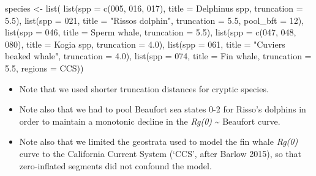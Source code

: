 \documentclass[
]{book}
\newenvironment{Shaded}{\begin{snugshade}}{\end{snugshade}}
\newcommand{\AttributeTok}[1]{\textcolor[rgb]{0.77,0.63,0.00}{#1}}
\newcommand{\FloatTok}[1]{\textcolor[rgb]{0.00,0.00,0.81}{#1}}
\newcommand{\FunctionTok}[1]{\textcolor[rgb]{0.00,0.00,0.00}{#1}}
\newcommand{\NormalTok}[1]{#1}
\newcommand{\OtherTok}[1]{\textcolor[rgb]{0.56,0.35,0.01}{#1}}
\newcommand{\StringTok}[1]{\textcolor[rgb]{0.31,0.60,0.02}{#1}}
\begin{document}
\begin{Shaded}
\begin{Highlighting}[]
\NormalTok{species }\OtherTok{\textless{}{-}} \FunctionTok{list}\NormalTok{(}
  \FunctionTok{list}\NormalTok{(}\AttributeTok{spp =} \FunctionTok{c}\NormalTok{(}\StringTok{\textquotesingle{}005\textquotesingle{}}\NormalTok{, }\StringTok{\textquotesingle{}016\textquotesingle{}}\NormalTok{, }\StringTok{\textquotesingle{}017\textquotesingle{}}\NormalTok{),}
       \AttributeTok{title =} \StringTok{\textquotesingle{}Delphinus spp\textquotesingle{}}\NormalTok{,}
       \AttributeTok{truncation =} \FloatTok{5.5}\NormalTok{),}
  \FunctionTok{list}\NormalTok{(}\AttributeTok{spp =} \StringTok{\textquotesingle{}021\textquotesingle{}}\NormalTok{,}
       \AttributeTok{title =} \StringTok{"Risso\textquotesingle{}s dolphin"}\NormalTok{,}
       \AttributeTok{truncation =} \FloatTok{5.5}\NormalTok{, }
       \AttributeTok{pool\_bft =} \StringTok{\textquotesingle{}12\textquotesingle{}}\NormalTok{),}
  \FunctionTok{list}\NormalTok{(}\AttributeTok{spp =} \StringTok{\textquotesingle{}046\textquotesingle{}}\NormalTok{,}
       \AttributeTok{title =} \StringTok{\textquotesingle{}Sperm whale\textquotesingle{}}\NormalTok{,}
       \AttributeTok{truncation =} \FloatTok{5.5}\NormalTok{),}
  \FunctionTok{list}\NormalTok{(}\AttributeTok{spp =} \FunctionTok{c}\NormalTok{(}\StringTok{\textquotesingle{}047\textquotesingle{}}\NormalTok{, }\StringTok{\textquotesingle{}048\textquotesingle{}}\NormalTok{, }\StringTok{\textquotesingle{}080\textquotesingle{}}\NormalTok{),}
       \AttributeTok{title =} \StringTok{\textquotesingle{}Kogia spp\textquotesingle{}}\NormalTok{,}
       \AttributeTok{truncation =} \FloatTok{4.0}\NormalTok{),}
  \FunctionTok{list}\NormalTok{(}\AttributeTok{spp =} \StringTok{\textquotesingle{}061\textquotesingle{}}\NormalTok{,}
       \AttributeTok{title =} \StringTok{"Cuvier\textquotesingle{}s beaked whale"}\NormalTok{,}
       \AttributeTok{truncation =} \FloatTok{4.0}\NormalTok{),}
  \FunctionTok{list}\NormalTok{(}\AttributeTok{spp =} \StringTok{\textquotesingle{}074\textquotesingle{}}\NormalTok{,}
       \AttributeTok{title =} \StringTok{\textquotesingle{}Fin whale\textquotesingle{}}\NormalTok{,}
       \AttributeTok{truncation =} \FloatTok{5.5}\NormalTok{,}
       \AttributeTok{regions =} \StringTok{\textquotesingle{}CCS\textquotesingle{}}\NormalTok{))}
\end{Highlighting}
\end{Shaded}

\begin{itemize}
\item
  Note that we used shorter truncation distances for cryptic species.
\item
  Note also that we had to pool Beaufort sea states 0-2 for Risso's dolphins in order to maintain a monotonic decline in the \emph{Rg(0)} \textasciitilde{} Beaufort curve.
\item
  Note also that we limited the geostrata used to model the fin whale \emph{Rg(0)} curve to the California Current System (`CCS', after Barlow 2015), so that zero-inflated segments did not confound the model.
\end{itemize}
\end{document}
